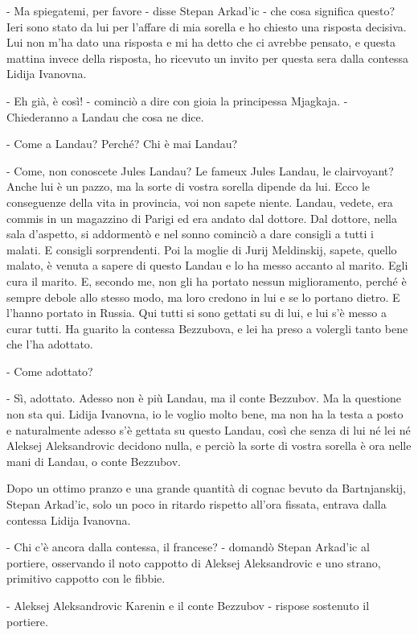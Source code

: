 - Ma spiegatemi, per favore - disse Stepan Arkad'ic - che cosa significa questo? Ieri sono stato da lui per l'affare di mia sorella e ho chiesto una risposta decisiva. Lui non m'ha dato una risposta e mi ha detto che ci avrebbe pensato, e questa mattina invece della risposta, ho ricevuto un invito per questa sera dalla contessa Lidija Ivanovna. 

- Eh già, è così! - cominciò a dire con gioia la principessa Mjagkaja. - Chiederanno a Landau che cosa ne dice. 

- Come a Landau? Perché? Chi è mai Landau? 

- Come, non conoscete Jules Landau? Le fameux Jules Landau, le clairvoyant? Anche lui è un pazzo, ma la sorte di vostra sorella dipende da lui. Ecco le conseguenze della vita in provincia, voi non sapete niente. Landau, vedete, era commis in un magazzino di Parigi ed era andato dal dottore. Dal dottore, nella sala d'aspetto, si addormentò e nel sonno cominciò a dare consigli a tutti i malati. E consigli sorprendenti. Poi la moglie di Jurij Meldinskij, sapete, quello malato, è venuta a sapere di questo Landau e lo ha messo accanto al marito. Egli cura il marito. E, secondo me, non gli ha portato nessun miglioramento, perché è sempre debole allo stesso modo, ma loro credono in lui e se lo portano dietro. E l'hanno portato in Russia. Qui tutti si sono gettati su di lui, e lui s'è messo a curar tutti. Ha guarito la contessa Bezzubova, e lei ha preso a volergli tanto bene che l'ha adottato. 

- Come adottato? 

- Sì, adottato. Adesso non è più Landau, ma il conte Bezzubov. Ma la questione non sta qui. Lidija Ivanovna, io le voglio molto bene, ma non ha la testa a posto e naturalmente adesso s'è gettata su questo Landau, così che senza di lui né lei né Aleksej Aleksandrovic decidono nulla, e perciò la sorte di vostra sorella è ora nelle mani di Landau, o conte Bezzubov. 

\label{xxi-6} 

Dopo un ottimo pranzo e una grande quantità di cognac bevuto da Bartnjanskij, Stepan Arkad'ic, solo un poco in ritardo rispetto all'ora fissata, entrava dalla contessa Lidija Ivanovna. 

- Chi c'è ancora dalla contessa, il francese? - domandò Stepan Arkad'ic al portiere, osservando il noto cappotto di Aleksej Aleksandrovic e uno strano, primitivo cappotto con le fibbie. 

- Aleksej Aleksandrovic Karenin e il conte Bezzubov - rispose sostenuto il portiere. 

